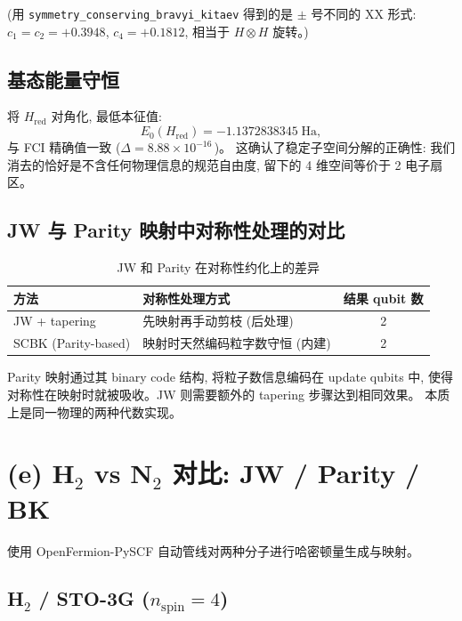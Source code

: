 \documentclass[fontset=mac]{ctexart}
\begin{document}
(用 \texttt{symmetry\_conserving\_bravyi\_kitaev} 得到的是 $\pm$ 号不同的 XX 形式:
$c_1 = c_2 = +0.3948$, $c_4 = +0.1812$, 相当于 $H \otimes H$ 旋转。)

\subsection*{基态能量守恒}

将 $H_{\text{red}}$ 对角化, 最低本征值:
\begin{equation}
    E_0(H_{\text{red}}) = -1.1372838345\;\text{Ha},
\end{equation}
与 FCI 精确值一致 ($\Delta = 8.88\times 10^{-16}$\,)。
这确认了稳定子空间分解的正确性:
我们消去的恰好是不含任何物理信息的规范自由度, 留下的 4 维空间等价于 2 电子扇区。

\subsection*{JW 与 Parity 映射中对称性处理的对比}

\begin{table}[H]
\centering
\begin{tabular}{l|l|c}
\toprule
\textbf{方法} & \textbf{对称性处理方式} & \textbf{结果 qubit 数} \\
\midrule
JW + tapering & 先映射再手动剪枝 (后处理) & 2 \\
SCBK (Parity-based) & 映射时天然编码粒字数守恒 (内建) & 2 \\
\bottomrule
\end{tabular}
\caption{JW 和 Parity 在对称性约化上的差异}
\end{table}

Parity 映射通过其 binary code 结构, 将粒子数信息编码在 update qubits 中,
使得对称性在映射时就被吸收。JW 则需要额外的 tapering 步骤达到相同效果。
本质上是同一物理的两种代数实现。

\section*{(e) H$_2$ vs N$_2$ 对比: JW / Parity / BK}

使用 OpenFermion-PySCF 自动管线对两种分子进行哈密顿量生成与映射。

\subsection*{H$_2$ / STO-3G ($n_{\text{spin}}=4$)}
\end{document}
